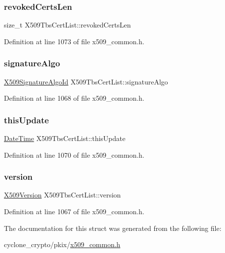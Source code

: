 \subsubsection{\texorpdfstring{revoked\+Certs\+Len}{revokedCertsLen}}
{\footnotesize\ttfamily size\+\_\+t X509\+Tbs\+Cert\+List\+::revoked\+Certs\+Len}



Definition at line 1073 of file x509\+\_\+common.\+h.

\mbox{\label{structX509TbsCertList_a9ddc6a9135a428e613a32a70efdd7d90}} 
\subsubsection{\texorpdfstring{signature\+Algo}{signatureAlgo}}
{\footnotesize\ttfamily \hyperlink{structX509SignatureAlgoId}{X509\+Signature\+Algo\+Id} X509\+Tbs\+Cert\+List\+::signature\+Algo}



Definition at line 1068 of file x509\+\_\+common.\+h.

\mbox{\label{structX509TbsCertList_aa762248fe58816b5353994f18d906b11}} 
\subsubsection{\texorpdfstring{this\+Update}{thisUpdate}}
{\footnotesize\ttfamily \hyperlink{structDateTime}{Date\+Time} X509\+Tbs\+Cert\+List\+::this\+Update}



Definition at line 1070 of file x509\+\_\+common.\+h.

\mbox{\label{structX509TbsCertList_aec546d0e6c62aee6789d27f84f5b2174}} 
\subsubsection{\texorpdfstring{version}{version}}
{\footnotesize\ttfamily \hyperlink{certificate_2x509__common_8h_a42c631650a1a4fbe9d70d54d99dcac26}{X509\+Version} X509\+Tbs\+Cert\+List\+::version}



Definition at line 1067 of file x509\+\_\+common.\+h.



The documentation for this struct was generated from the following file\+:\begin{DoxyCompactItemize}
\item 
cyclone\+\_\+crypto/pkix/\hyperlink{pkix_2x509__common_8h}{x509\+\_\+common.\+h}\end{DoxyCompactItemize}
